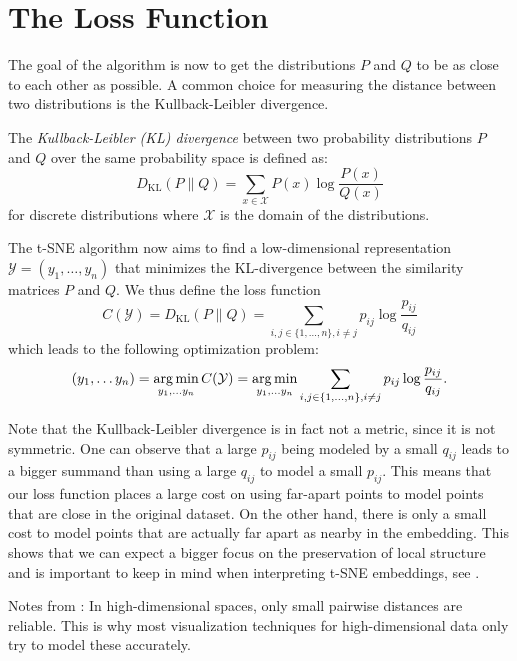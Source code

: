\section{The Loss Function}
The goal of the algorithm is now to get the distributions $P$ and $Q$ to be as close to each other as possible. 
A common choice for measuring the distance  between two distributions is the Kullback-Leibler divergence. 

\begin{defi}
    The \emph{Kullback-Leibler (KL) divergence} between two probability distributions $P$ and $Q$ over the same probability space is defined as:
    \[
    D_{\text{KL}}(P \parallel Q) = \sum_{x \in \mathcal{X}} P(x) \log\frac{P(x)}{Q(x)}
    \]
    for discrete distributions where \(\mathcal{X}\) is the domain of the distributions.
\end{defi}

The t-SNE algorithm now aims to find a low-dimensional representation $\mathcal{Y} = (y_1, \dots, y_n)$ that minimizes the KL-divergence between the similarity matrices $P$ and $Q$. 
We thus define the loss function 
\begin{equation}
    C(\mathcal{Y}) = D_{\text{KL}}(P \parallel Q) = \sum_{i,j \in \{1,\dots,n\}, i \neq j} p_{ij} \log \frac{p_{ij}}{q_{ij}}
\end{equation}
which leads to the following optimization problem: 
\begin{equation}
    (y_1, \dots y_n) = \operatorname*{arg\,min}_{y_1, \dots y_n} C(\mathcal{Y}) = \operatorname*{arg\,min}_{y_1, \dots y_n} \sum_{i,j \in \{1,\dots,n\}, i \neq j} p_{ij} \log \frac{p_{ij}}{q_{ij}}.
\end{equation}


Note that the Kullback-Leibler divergence is in fact not a metric, since it is not symmetric. 
One can observe that a large $p_{ij}$ being modeled by a small $q_{ij}$ leads to a bigger summand than using a large $q_{ij}$ to model a small $p_{ij}$. 
This means that our loss function places a large cost on using far-apart points to model points that are close in the original dataset. 
On the other hand, there is only a small cost to model points that are actually far apart as nearby in the embedding. 
This shows that we can expect a bigger focus on the preservation of local structure and is important to keep in mind when interpreting t-SNE embeddings, see \cite{Wa16Distill}. 

Notes from \cite{vdMaa14}: In high-dimensional spaces, only small pairwise distances are reliable. This is why most visualization techniques for high-dimensional data only try to model these accurately.

